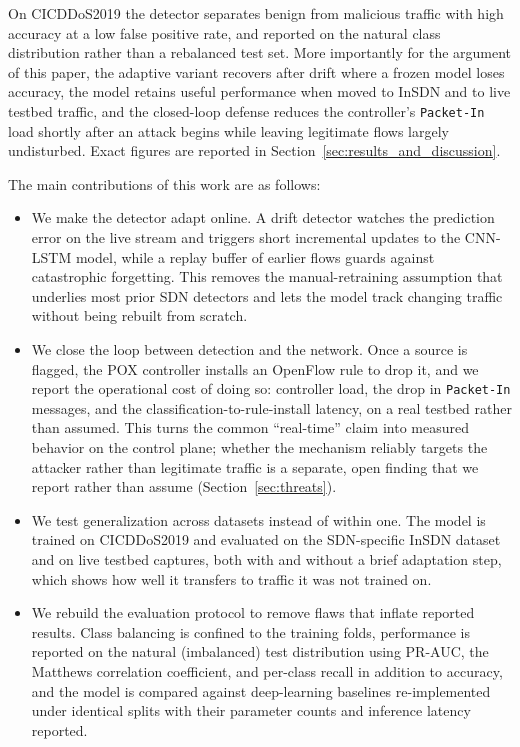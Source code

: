\documentclass[ASNA,twocolumn]{USG} %
\begin{document}
On CICDDoS2019 the detector separates benign from malicious traffic with high accuracy at a low false positive rate, and reported on the natural class distribution rather than a rebalanced test set. More importantly for the argument of this paper, the adaptive variant recovers after drift where a frozen model loses accuracy, the model retains useful performance when moved to InSDN and to live testbed traffic, and the closed-loop defense reduces the controller's \texttt{Packet-In} load shortly after an attack begins while leaving legitimate flows largely undisturbed. Exact figures are reported in Section~\ref{sec:results_and_discussion}.


The main contributions of this work are as follows:
\begin{itemize}
    \item We make the detector adapt online. A drift detector watches the prediction error on the live stream and triggers short incremental updates to the CNN-LSTM model, while a replay buffer of earlier flows guards against catastrophic forgetting. This removes the manual-retraining assumption that underlies most prior SDN detectors and lets the model track changing traffic without being rebuilt from scratch.
    \item We close the loop between detection and the network. Once a source is flagged, the POX controller installs an OpenFlow rule to drop it, and we report the operational cost of doing so: controller load, the drop in \texttt{Packet-In} messages, and the classification-to-rule-install latency, on a real testbed rather than assumed. This turns the common ``real-time'' claim into measured behavior on the control plane; whether the mechanism reliably targets the attacker rather than legitimate traffic is a separate, open finding that we report rather than assume (Section~\ref{sec:threats}).
    \item We test generalization across datasets instead of within one. The model is trained on CICDDoS2019 and evaluated on the SDN-specific InSDN dataset and on live testbed captures, both with and without a brief adaptation step, which shows how well it transfers to traffic it was not trained on.
    \item We rebuild the evaluation protocol to remove flaws that inflate reported results. Class balancing is confined to the training folds, performance is reported on the natural (imbalanced) test distribution using PR-AUC, the Matthews correlation coefficient, and per-class recall in addition to accuracy, and the model is compared against deep-learning baselines re-implemented under identical splits with their parameter counts and inference latency reported.
\end{itemize}
\end{document}
